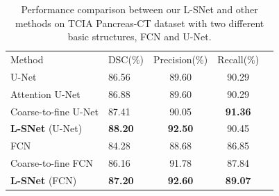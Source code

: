 \documentclass{article}
\begin{document}

\begin{table}[t]
\centering\vspace{-10pt}
\caption{Performance comparison between our L-SNet and other methods on TCIA Pancreas-CT dataset with two different basic structures, FCN and U-Net.}
\vspace{-10pt}
\label{tab:mainresult}
\setlength{\tabcolsep}{1.3mm}
\begin{tabular}{p{3cm}lccc}
\hline\noalign{\smallskip}
  Method & DSC(\%) & Precision(\%) & Recall(\%)\\
\noalign{\smallskip} \hline \noalign{\smallskip}
U-Net\cite{unet}    & 86.56  & 89.60  & 90.29\\
Attention U-Net\cite{attentionunet}    & 86.88 & 89.60  & 90.29 \\
Coarse-to-fine U-Net & 87.41  &  90.05  & \textbf{91.36} \\
\textbf{L-SNet} (U-Net) &  \textbf{88.20}  & \textbf{92.50}  & 90.45 \\
\hline
FCN\cite{FCN}    & 84.28  & 88.68  & 86.85\\
Coarse-to-fine FCN & 86.16  &  91.78  & 87.84 \\
\textbf{L-SNet} (FCN) &  \textbf{87.20}  & \textbf{92.60}  & \textbf{89.07} \\
\hline
\end{tabular}\vspace{-10pt}
\end{table}
\end{document}
